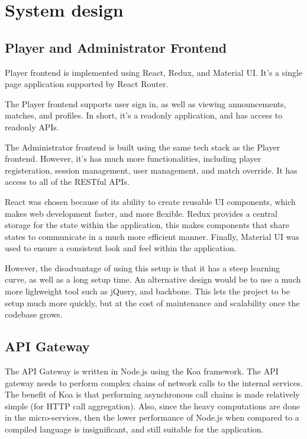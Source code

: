 \documentclass{article}
\begin{document}
\newpage
\section{System design}

\subsection{Player and Administrator Frontend}
Player frontend is implemented using React, Redux, and Material UI. It's a single page application supported by React Router.

The Player frontend supports user sign in, as well as viewing announcements, matches, and profiles. In short, it's a readonly application, and has access to readonly APIs.

The Administrator frontend is built using the same tech stack as the Player frontend. However, it's has much more functionalities, including player registeration, session management, user management, and match override. It has access to all of the RESTful APIs.

React was chosen because of its ability to create reusable UI components, which makes web development faster, and more flexible. Redux provides a central storage for the state within the application, this makes components that share states to communicate in a much more efficient manner. Finally, Material UI was used to ensure a consistent look and feel within the application.

However, the disadvantage of using this setup is that it has a steep learning curve, as well as a long setup time. An alternative design would be to use a much more lighweight tool such as jQuery, and backbone. This lets the project to be setup much more quickly, but at the cost of maintenance and scalability once the codebase grows.

\subsection{API Gateway}
The API Gateway is written in Node.js using the Koa framework. The API gateway needs to perform complex chains of network calls to the internal services. The benefit of Koa is that performing asynchronous call chains is made relatively simple (for HTTP call aggregation). Also, since the heavy computations are done in the micro-services, then the lower performance of Node.js when compared to a compiled language is insignificant, and still suitable for the application.
\end{document}
